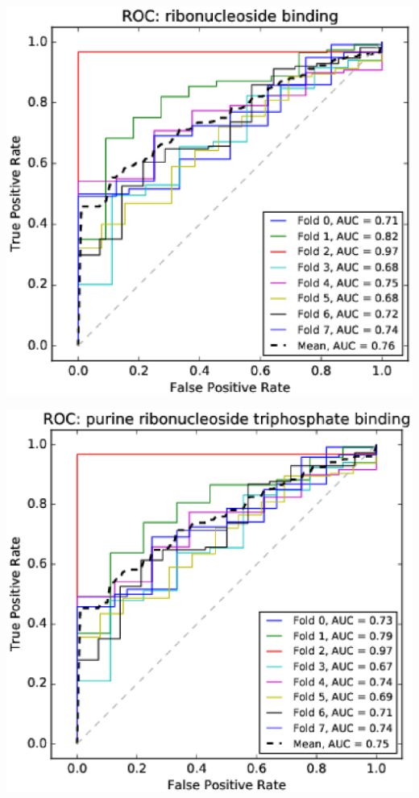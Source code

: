 \documentclass[11pt,twoside,a4paper]{book}
\newenvironment{Figure}
  {\par\medskip\noindent\minipage{\linewidth}}
  {\endminipage\par\medskip}
\begin{document}
\begin{multicols}{2}
\begin{Figure}\begin{center}\includegraphics[width=\linewidth]{figures/roc_ribonucleoside_binding}\label{fig:roc_ribonucleoside_binding}\end{center}\end{Figure}
\begin{Figure}\begin{center}\includegraphics[width=\linewidth]{figures/roc_purine_ribonucleoside_triphosphate_binding}\label{fig:roc_purine_ribonucleoside_triphosphate_binding}\end{center}\end{Figure}

\end{multicols}
\end{document}
